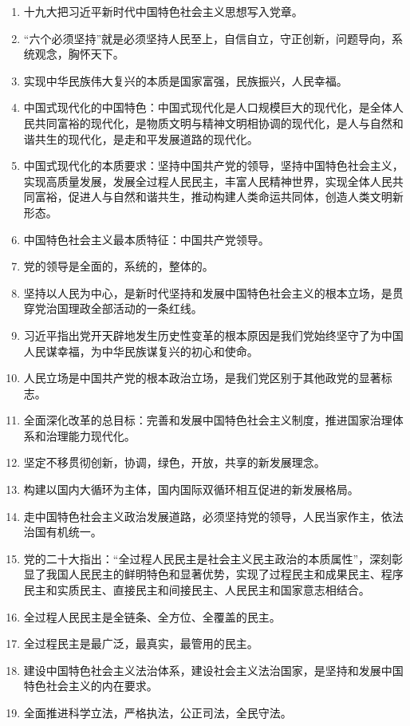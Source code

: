 \documentclass[12pt, a4paper, oneside]{ctexbook}
\begin{document}
\begin{enumerate}
\item 十九大把习近平新时代中国特色社会主义思想写入党章。
\item “六个必须坚持”就是必须坚持人民至上，自信自立，守正创新，问题导向，系统观念，胸怀天下。
\item 实现中华民族伟大复兴的本质是国家富强，民族振兴，人民幸福。
\item 中国式现代化的中国特色：中国式现代化是人口规模巨大的现代化，是全体人民共同富裕的现代化，是物质文明与精神文明相协调的现代化，是人与自然和谐共生的现代化，是走和平发展道路的现代化。
\item 中国式现代化的本质要求：坚持中国共产党的领导，坚持中国特色社会主义，实现高质量发展，发展全过程人民民主，丰富人民精神世界，实现全体人民共同富裕，促进人与自然和谐共生，推动构建人类命运共同体，创造人类文明新形态。
\item 中国特色社会主义最本质特征：中国共产党领导。
\item 党的领导是全面的，系统的，整体的。
\item 坚持以人民为中心，是新时代坚持和发展中国特色社会主义的根本立场，是贯穿党治国理政全部活动的一条红线。
\item 习近平指出党开天辟地发生历史性变革的根本原因是我们党始终坚守了为中国人民谋幸福，为中华民族谋复兴的初心和使命。
\item 人民立场是中国共产党的根本政治立场，是我们党区别于其他政党的显著标志。
\item 全面深化改革的总目标：完善和发展中国特色社会主义制度，推进国家治理体系和治理能力现代化。
\item 坚定不移贯彻创新，协调，绿色，开放，共享的新发展理念。
\item 构建以国内大循环为主体，国内国际双循环相互促进的新发展格局。
\item 走中国特色社会主义政治发展道路，必须坚持党的领导，人民当家作主，依法治国有机统一。
\item 党的二十大指出：“全过程人民民主是社会主义民主政治的本质属性”，深刻彰显了我国人民民主的鲜明特色和显著优势，实现了过程民主和成果民主、程序民主和实质民主、直接民主和间接民主、人民民主和国家意志相结合。
\item 全过程人民民主是全链条、全方位、全覆盖的民主。
\item 全过程民主是最广泛，最真实，最管用的民主。
\item 建设中国特色社会主义法治体系，建设社会主义法治国家，是坚持和发展中国特色社会主义的内在要求。
\item 全面推进科学立法，严格执法，公正司法，全民守法。

\end{enumerate}
\end{document}
